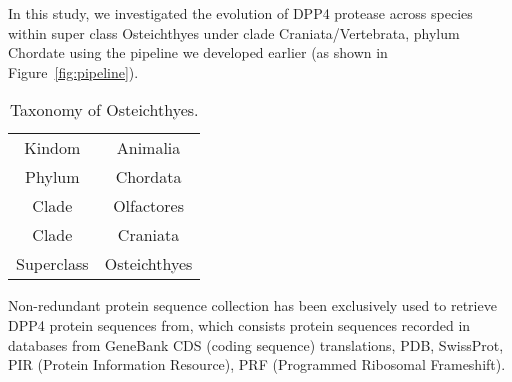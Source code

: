 In this study, we investigated the evolution of DPP4 protease across species within super class Osteichthyes under clade Craniata/Vertebrata, phylum Chordate using the pipeline we developed earlier (as shown in Figure~\ref{fig:pipeline}). 

\begin{table} 
\caption{Taxonomy of Osteichthyes. \cite{18563158}} 
\centering
    \begin{tabular}{| c | c |}
    \hline
        Kindom & Animalia \\ 
        Phylum & Chordata \\ 
        Clade & Olfactores \\ 
        Clade & Craniata \\ 
        Superclass &  Osteichthyes\\ 
    \hline
    \end{tabular} 
\end{table}

Non-redundant protein sequence collection has been exclusively used to retrieve DPP4 protein sequences from, which consists protein sequences recorded in databases from GeneBank CDS (coding sequence) translations, PDB, SwissProt, PIR (Protein Information Resource), PRF (Programmed Ribosomal Frameshift). 